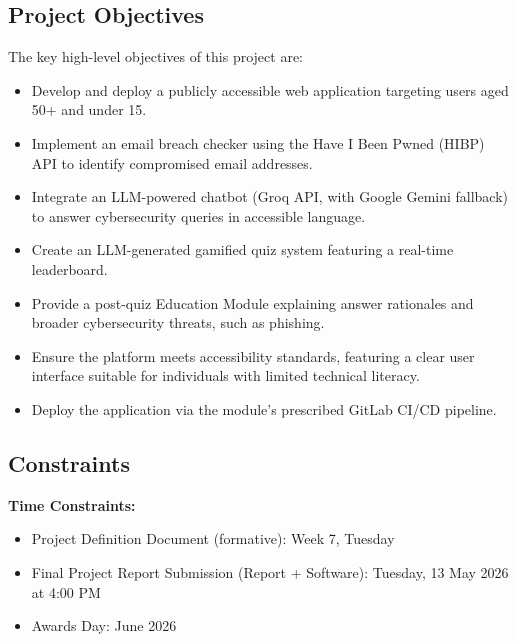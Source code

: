 \documentclass[11pt, a4paper]{report}
\begin{document}
\subsection{Project Objectives}
The key high-level objectives of this project are: 
\begin{itemize}
    \item Develop and deploy a publicly accessible web application targeting users aged 50+ and under 15. 
    \item Implement an email breach checker using the Have I Been Pwned (HIBP) API to identify compromised email addresses. 
    \item Integrate an LLM-powered chatbot (Groq API, with Google Gemini fallback) to answer cybersecurity queries in accessible language. 
    \item Create an LLM-generated gamified quiz system featuring a real-time leaderboard. 
    \item Provide a post-quiz Education Module explaining answer rationales and broader cybersecurity threats, such as phishing.
    \item Ensure the platform meets accessibility standards, featuring a clear user interface suitable for individuals with limited technical literacy. 
    \item Deploy the application via the module's prescribed GitLab CI/CD pipeline. 
\end{itemize}

\subsection{Constraints}

\textbf{Time Constraints:}
\begin{itemize}
    \item Project Definition Document (formative): Week 7, Tuesday 
    \item Final Project Report Submission (Report + Software): Tuesday, 13 May 2026 at 4:00 PM 
    \item Awards Day: June 2026 
\end{itemize}
\end{document}
